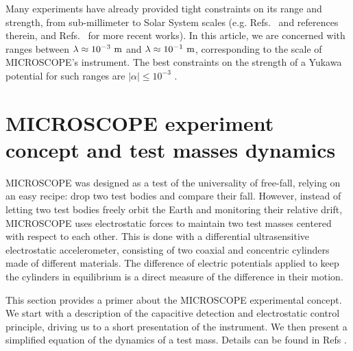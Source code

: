 \documentclass[12pt]{iopart}
\begin{document}
Many experiments have already provided tight constraints on its range and strength, from sub-millimeter to Solar System scales (e.g. Refs.~\cite{adelberger03,fischbach99} and references therein, and Refs.~\cite{kapner07,masuda09,sushkov11,klimchitskaya14,berge18} for more recent works). In this article, we are concerned with ranges between $\lambda\approx 10^{-3}~{\rm m}$ and $\lambda\approx10^{-1}~{\rm m}$, corresponding to the scale of MICROSCOPE's instrument. The best constraints on the strength of a Yukawa potential for such ranges are $|\alpha|\leqslant 10^{-3}$ \cite{yang12, tan16, tan20}.




\section{MICROSCOPE experiment concept and test masses dynamics} \label{sect_mic}

MICROSCOPE was designed as a test of the universality of free-fall, relying on an easy recipe: drop two test bodies and compare their fall. However, instead of letting two test bodies freely orbit the Earth and monitoring their relative drift, MICROSCOPE uses electrostatic forces to maintain two test masses centered with respect to each other. This is done with a differential ultrasensitive electrostatic accelerometer, consisting of two coaxial and concentric cylinders made of different materials. The difference of electric potentials applied to keep the cylinders in equilibrium is a direct measure of the difference in their motion. %

This section provides a primer about the MICROSCOPE experimental concept. We start with a description of the capacitive detection and electrostatic control principle, driving us to a short presentation of the instrument. We then present a simplified equation of the dynamics of a test mass. Details can be found in Refs \cite{touboul20, liorzou20, robert20}.
\end{document}
